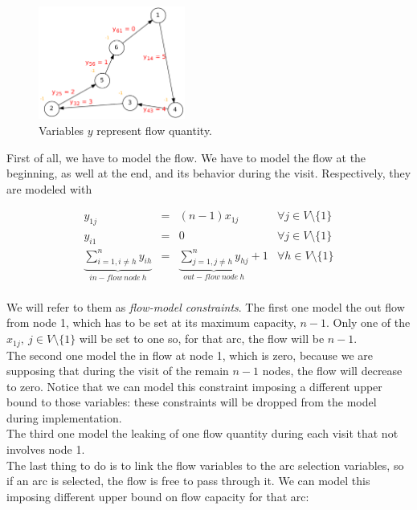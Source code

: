 \begin{figure}[h]
    \centering
    \includegraphics[width=0.43\textwidth]{figures/gg}
    \caption{Variables $y$ represent flow quantity.}
    \label{fig:GG_example}
\end{figure}

First of all, we have to model the flow. We have to model the flow at the
beginning, as well at the end, and its behavior during the visit.
Respectively, they are modeled with

\begin{equation*} 
    \begin{array}{rrlr} 
        y_{1j} & = & (n - 1) x_{1j} & \forall j \in V \setminus \{1\} \\
        y_{i1} & = & 0 &\forall j \in V \setminus \{1\} \\
        \underbrace{\displaystyle\sum\limits_{i = 1, i \neq h}^n y_{ih}}_{in-flow\ node\ h} & = & \underbrace{\displaystyle\sum\limits_{j = 1, j \neq h}^n y_{hj}}_{out-flow\ node\ h} + 1 & \forall h \in V \setminus \{1\}\\
    \end{array} 
\end{equation*}

We will refer to them as \emph{flow-model constraints}. The first one model the
out flow from node 1, which has to be set at its maximum capacity, $n - 1$.
Only one of the $x_{1j},\ j \in V \setminus \{1\}$ will be set to one so, for
that arc, the flow will be $n - 1$.\\ The second one model the in flow at node
1, which is zero, because we are supposing that during the visit of the remain
$n - 1$ nodes, the flow will decrease to zero. Notice that we can model this
constraint imposing a different upper bound to those variables: these
constraints will be dropped from the model during implementation.\\ The third
one model the leaking of one flow quantity during each visit that not involves
node 1.\\
The last thing to do is to link the flow variables to the arc selection
variables, so if an arc is selected, the flow is free to pass through it. We
can model this imposing different upper bound on flow capacity for that arc:


